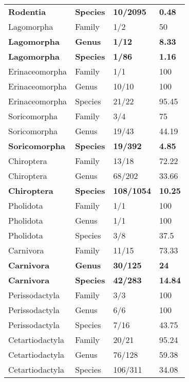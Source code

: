 \begin{longtable}{llll}
  \textbf{Rodentia} & \textbf{Species} & \textbf{10/2095} & \textbf{0.48} \\ 
  Lagomorpha & Family & 1/2 & 50 \\ 
  \textbf{Lagomorpha} & \textbf{Genus} & \textbf{1/12} & \textbf{8.33} \\ 
  \textbf{Lagomorpha} & \textbf{Species} & \textbf{1/86} & \textbf{1.16} \\ 
  Erinaceomorpha & Family & 1/1 & 100 \\ 
  Erinaceomorpha & Genus & 10/10 & 100 \\ 
  Erinaceomorpha & Species & 21/22 & 95.45 \\ 
  Soricomorpha & Family & 3/4 & 75 \\ 
  Soricomorpha & Genus & 19/43 & 44.19 \\ 
  \textbf{Soricomorpha} & \textbf{Species} & \textbf{19/392} & \textbf{4.85} \\ 
  Chiroptera & Family & 13/18 & 72.22 \\ 
  Chiroptera & Genus & 68/202 & 33.66 \\ 
  \textbf{Chiroptera} & \textbf{Species} & \textbf{108/1054} & \textbf{10.25} \\ 
  Pholidota & Family & 1/1 & 100 \\ 
  Pholidota & Genus & 1/1 & 100 \\ 
  Pholidota & Species & 3/8 & 37.5 \\ 
  Carnivora & Family & 11/15 & 73.33 \\ 
  \textbf{Carnivora} & \textbf{Genus} & \textbf{30/125} & \textbf{24} \\ 
  \textbf{Carnivora} & \textbf{Species} & \textbf{42/283} & \textbf{14.84} \\ 
  Perissodactyla & Family & 3/3 & 100 \\ 
  Perissodactyla & Genus & 6/6 & 100 \\ 
  Perissodactyla & Species & 7/16 & 43.75 \\ 
  Cetartiodactyla & Family & 20/21 & 95.24 \\ 
  Cetartiodactyla & Genus & 76/128 & 59.38 \\ 
  Cetartiodactyla & Species & 106/311 & 34.08 \\ 
   \hline
\hline
\end{longtable}
